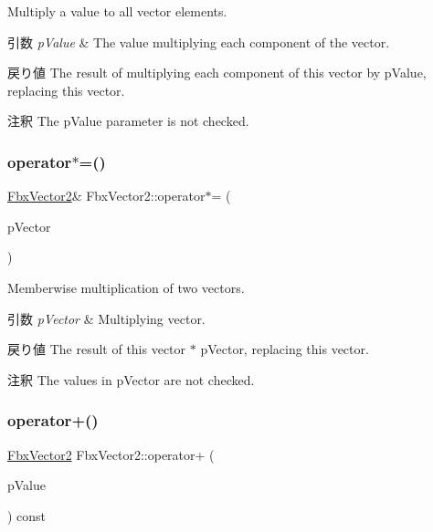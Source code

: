 Multiply a value to all vector elements. 
\begin{DoxyParams}{引数}
{\em p\+Value} & The value multiplying each component of the vector. \\
\hline
\end{DoxyParams}
\begin{DoxyReturn}{戻り値}
The result of multiplying each component of this vector by p\+Value, replacing this vector. 
\end{DoxyReturn}
\begin{DoxyRemark}{注釈}
The p\+Value parameter is not checked. 
\end{DoxyRemark}
\mbox{\label{class_fbx_vector2_aeef4474f48ac7dc57d0e159d0850f0c4}} 
\subsubsection{\texorpdfstring{operator$\ast$=()}{operator*=()}\hspace{0.1cm}{\footnotesize\ttfamily [2/2]}}
{\footnotesize\ttfamily \hyperlink{class_fbx_vector2}{Fbx\+Vector2}\& Fbx\+Vector2\+::operator$\ast$= (\begin{DoxyParamCaption}\item[{const \hyperlink{class_fbx_vector2}{Fbx\+Vector2} \&}]{p\+Vector }\end{DoxyParamCaption})}

Memberwise multiplication of two vectors. 
\begin{DoxyParams}{引数}
{\em p\+Vector} & Multiplying vector. \\
\hline
\end{DoxyParams}
\begin{DoxyReturn}{戻り値}
The result of this vector $\ast$ p\+Vector, replacing this vector. 
\end{DoxyReturn}
\begin{DoxyRemark}{注釈}
The values in p\+Vector are not checked. 
\end{DoxyRemark}
\mbox{\label{class_fbx_vector2_abe39db5f7fa88c58d5bb6562de8b0e08}} 
\subsubsection{\texorpdfstring{operator+()}{operator+()}\hspace{0.1cm}{\footnotesize\ttfamily [1/2]}}
{\footnotesize\ttfamily \hyperlink{class_fbx_vector2}{Fbx\+Vector2} Fbx\+Vector2\+::operator+ (\begin{DoxyParamCaption}\item[{double}]{p\+Value }\end{DoxyParamCaption}) const}


